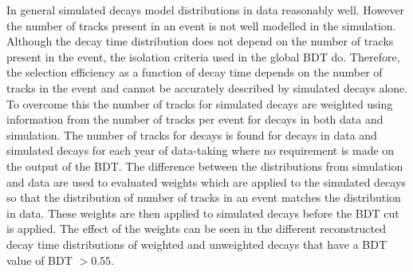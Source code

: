 In general simulated decays model distributions in data reasonably well. However the number of tracks present in an event is not well modelled in the simulation. %
Although the \bsmumu decay time distribution does not depend on the number of tracks present in the event, the isolation criteria used in the global BDT do. Therefore, the selection efficiency as a function of decay time depends on the number of tracks in the event and cannot be accurately described by simulated decays alone. To overcome this the number of tracks for simulated \bsmumu decays are weighted using information from the number of tracks per event for \bdkpi decays in both data and simulation. The number of tracks for \bdkpi decays is found for decays in data and simulated decays for each year of data-taking where no requirement is made on the output of the BDT. The difference between the distributions from simulation and data are used to evaluated weights which are applied to the simulated decays so that the distribution of number of tracks in an event matches the distribution in data. These weights are then applied to simulated \bsmumu decays before the BDT cut is applied. The effect of the weights can be seen in the different reconstructed decay time distributions of weighted and unweighted decays that have a BDT value of BDT $>0.55$.




